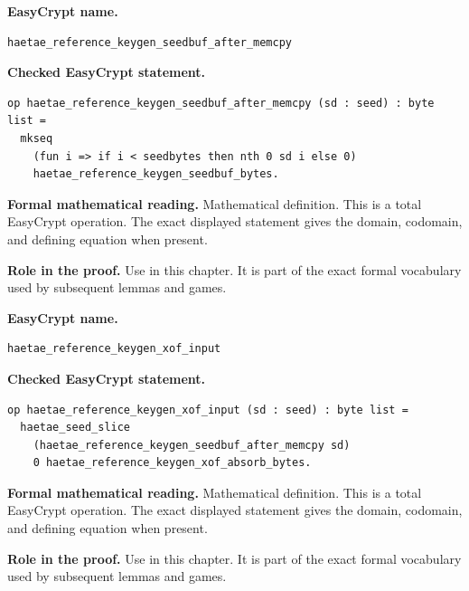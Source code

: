 \begin{formaldefinition}
\noindent\textbf{EasyCrypt name.}
\begin{lstlisting}[language=EasyCrypt,basicstyle=\ttfamily\scriptsize]
haetae_reference_keygen_seedbuf_after_memcpy
\end{lstlisting}
\noindent\textbf{Checked EasyCrypt statement.}
\begin{lstlisting}[language=EasyCrypt,basicstyle=\ttfamily\scriptsize]
op haetae_reference_keygen_seedbuf_after_memcpy (sd : seed) : byte list =
  mkseq
    (fun i => if i < seedbytes then nth 0 sd i else 0)
    haetae_reference_keygen_seedbuf_bytes.
\end{lstlisting}
\noindent\textbf{Formal mathematical reading.}
Mathematical definition. This is a total EasyCrypt operation.  The exact displayed statement gives the domain, codomain, and defining equation when present.

\noindent\textbf{Role in the proof.}
Use in this chapter. It is part of the exact formal vocabulary used by subsequent lemmas and games.

\end{formaldefinition}

\begin{formaldefinition}
\noindent\textbf{EasyCrypt name.}
\begin{lstlisting}[language=EasyCrypt,basicstyle=\ttfamily\scriptsize]
haetae_reference_keygen_xof_input
\end{lstlisting}
\noindent\textbf{Checked EasyCrypt statement.}
\begin{lstlisting}[language=EasyCrypt,basicstyle=\ttfamily\scriptsize]
op haetae_reference_keygen_xof_input (sd : seed) : byte list =
  haetae_seed_slice
    (haetae_reference_keygen_seedbuf_after_memcpy sd)
    0 haetae_reference_keygen_xof_absorb_bytes.
\end{lstlisting}
\noindent\textbf{Formal mathematical reading.}
Mathematical definition. This is a total EasyCrypt operation.  The exact displayed statement gives the domain, codomain, and defining equation when present.

\noindent\textbf{Role in the proof.}
Use in this chapter. It is part of the exact formal vocabulary used by subsequent lemmas and games.

\end{formaldefinition}

